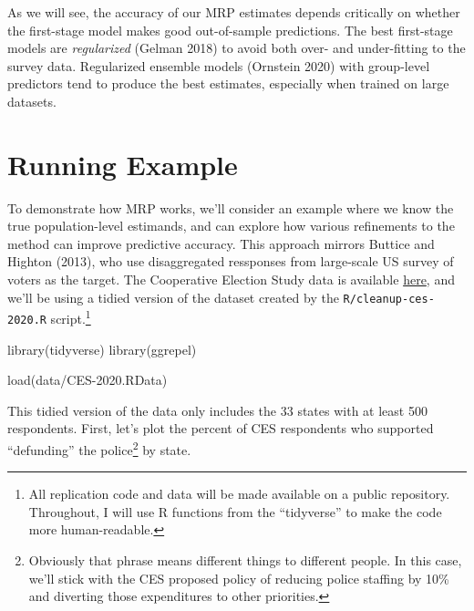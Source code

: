 \documentclass[
]{article}
\newenvironment{Shaded}{\begin{snugshade}}{\end{snugshade}}
\newcommand{\FunctionTok}[1]{\textcolor[rgb]{0.00,0.00,0.00}{#1}}
\newcommand{\NormalTok}[1]{#1}
\newcommand{\StringTok}[1]{\textcolor[rgb]{0.31,0.60,0.02}{#1}}
\begin{document}
As we will see, the accuracy of our MRP estimates depends critically on
whether the first-stage model makes good out-of-sample predictions. The
best first-stage models are \emph{regularized} (Gelman 2018) to avoid
both over- and under-fitting to the survey data. Regularized ensemble
models (Ornstein 2020) with group-level predictors tend to produce the
best estimates, especially when trained on large datasets.

\hypertarget{running-example}{%
\section{Running Example}\label{running-example}}

To demonstrate how MRP works, we'll consider an example where we know
the true population-level estimands, and can explore how various
refinements to the method can improve predictive accuracy. This approach
mirrors Buttice and Highton (2013), who use disaggregated ressponses
from large-scale US survey of voters as the target. The Cooperative
Election Study data is available
\href{https://dataverse.harvard.edu/dataset.xhtml?persistentId=doi\%3A10.7910/DVN/E9N6PH}{here},
and we'll be using a tidied version of the dataset created by the
\texttt{R/cleanup-ces-2020.R} script.\footnote{All replication code and
  data will be made available on a public repository. Throughout, I will
  use R functions from the ``tidyverse'' to make the code more
  human-readable.}

\begin{Shaded}
\begin{Highlighting}[]
\FunctionTok{library}\NormalTok{(tidyverse)}
\FunctionTok{library}\NormalTok{(ggrepel)}

\FunctionTok{load}\NormalTok{(}\StringTok{\textquotesingle{}data/CES{-}2020.RData\textquotesingle{}}\NormalTok{)}
\end{Highlighting}
\end{Shaded}

This tidied version of the data only includes the 33 states with at
least 500 respondents. First, let's plot the percent of CES respondents
who supported ``defunding'' the police\footnote{Obviously that phrase
  means different things to different people. In this case, we'll stick
  with the CES proposed policy of reducing police staffing by 10\% and
  diverting those expenditures to other priorities.} by state.
\end{document}
